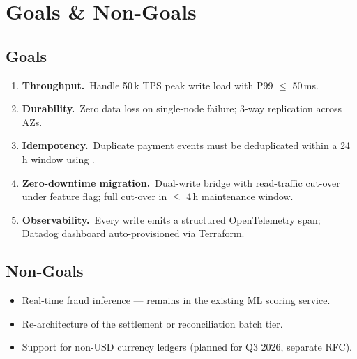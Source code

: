 \section{Goals \& Non-Goals}

\subsection{Goals}
\begin{enumerate}
  \item \textbf{Throughput.}\ Handle 50\,k TPS peak write load with P99 $\leq$ 50\,ms.
  \item \textbf{Durability.}\ Zero data loss on single-node failure; 3-way
        replication across AZs.
  \item \textbf{Idempotency.}\ Duplicate payment events must be deduplicated
        within a 24\,h window using .
  \item \textbf{Zero-downtime migration.}\ Dual-write bridge with read-traffic
        cut-over under feature flag; full cut-over in $\leq$ 4\,h maintenance window.
  \item \textbf{Observability.}\ Every write emits a structured OpenTelemetry span;
        Datadog dashboard auto-provisioned via Terraform.
\end{enumerate}

\subsection{Non-Goals}
\begin{itemize}
  \item Real-time fraud inference — remains in the existing ML scoring service.
  \item Re-architecture of the settlement or reconciliation batch tier.
  \item Support for non-USD currency ledgers (planned for Q3 2026, separate RFC).
\end{itemize}

